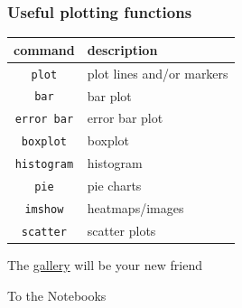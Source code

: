 \documentclass[xcolor=dvipsnames]{beamer}
\begin{document}
\begin{frame}[fragile]
\frametitle{Useful plotting functions}
\footnotesize
\begin{center}
    \begin{table}
        \begin{tabular}{|c|l|}
	\hline
	command                  & description                     \\
	\hline 
	\texttt{plot}            & plot lines and/or markers  \\
	\texttt{bar}             & bar plot                   \\
	\texttt{error bar}       & error bar plot             \\
	\texttt{boxplot}         & boxplot                    \\
	\texttt{histogram}       & histogram                  \\
	\texttt{pie}             & pie charts                 \\ 
	\texttt{imshow}          & heatmaps/images            \\
	\texttt{scatter}         & scatter plots              \\ 
	\hline 
	\end{tabular}
    \end{table}
\end{center}

The \href{http://matplotlib.org/gallery.html}{gallery} will be your new friend
\end{frame}

\begin{frame}[fragile]
\begin{block}{}
 To the Notebooks
\end{block}
\end{frame}

\end{document}
